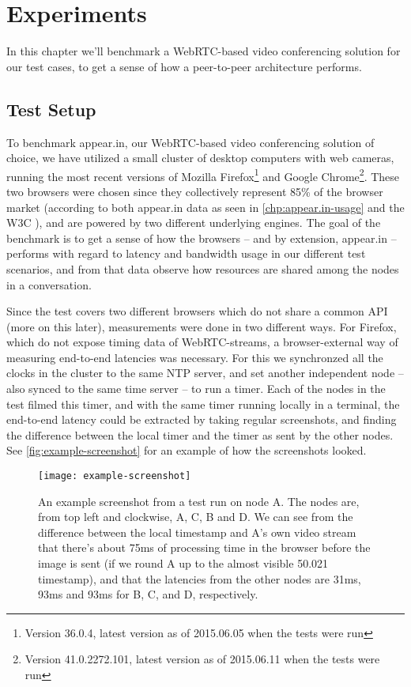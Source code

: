 \chapter{Experiments}\label{chp:experiments}

In this chapter we'll benchmark a WebRTC-based video conferencing solution for our test cases, to get a sense of how a peer-to-peer architecture performs.


\section{Test Setup}

To benchmark appear.in, our WebRTC-based video conferencing solution of choice, we have utilized a small cluster of desktop computers with web cameras, running the most recent versions of Mozilla Firefox\footnote{Version 36.0.4, latest version as of 2015.06.05 when the tests were run} and Google Chrome\footnote{Version 41.0.2272.101, latest version as of 2015.06.11 when the tests were run}. These two browsers were chosen since they collectively represent 85\% of the browser market (according to both appear.in data as seen in \autoref{chp:appear.in-usage} and the W3C \cite{browser-stats}), and are powered by two different underlying engines. The goal of the benchmark is to get a sense of how the browsers -- and by extension, appear.in -- performs with regard to latency and bandwidth usage in our different test scenarios, and from that data observe how resources are shared among the nodes in a conversation.

Since the test covers two different browsers which do not share a common API (more on this later), measurements were done in two different ways. For Firefox, which do not expose timing data of WebRTC-streams, a browser-external way of measuring end-to-end latencies was necessary. For this we synchronzed all the clocks in the cluster to the same \gls{NTP} server, and set another independent node -- also synced to the same time server -- to run a timer. Each of the nodes in the test filmed this timer, and with the same timer running locally in a terminal, the end-to-end latency could be extracted by taking regular screenshots, and finding the difference between the local timer and the timer as sent by the other nodes. See \autoref{fig:example-screenshot} for an example of how the screenshots looked.

\begin{figure}
    \centering
    \texttt{[image: example-screenshot]}
    \caption{An example screenshot from a test run on node A. The nodes are, from top left and clockwise, A, C, B and D. We can see from the difference between the local timestamp and A's own video stream that there's about 75ms of processing time in the browser before the image is sent (if we round A up to the almost visible 50.021 timestamp), and that the latencies from the other nodes are 31ms, 93ms and 93ms for B, C, and D, respectively.}
    \label{fig:example-screenshot}
\end{figure}

